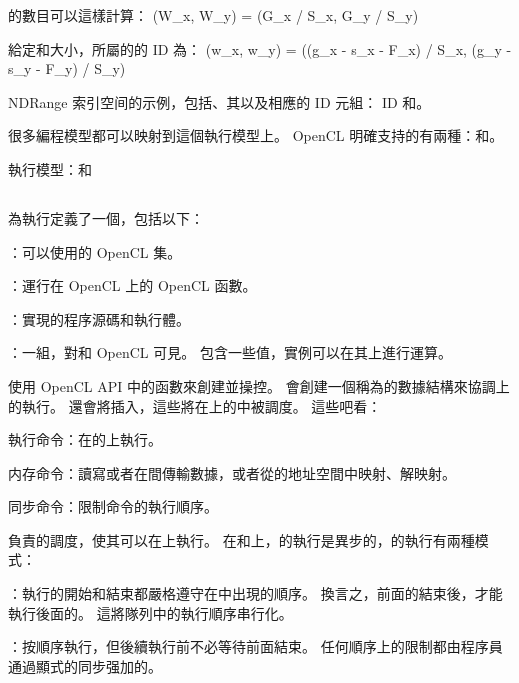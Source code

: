 的數目可以這樣計算：
\startformula
(W_x, W_y) = (G_x / S_x, G_y / S_y)
\stopformula

給定和大小，所屬的的 ID 為：
\startformula
(w_x, w_y) = ((g_x - s_x - F_x) / S_x, (g_y - s_y - F_y) / S_y)
\stopformula

\startbuffer[buffigindexspacecaption]
NDRange 索引空间的示例，包括、其以及相應的 ID 元組： ID 和。
\stopbuffer
{}
{}

很多編程模型都可以映射到這個執行模型上。
OpenCL 明確支持的有兩種：和。

\startbuffer[buftitleemccmdq]
執行模型：和
\stopbuffer
\subsection{\getbuffer[buftitleemccmdq]}

為執行定義了一個，包括以下：
\startigNum
\item {}：可以使用的 OpenCL 集。
\item {}：運行在 OpenCL 上的 OpenCL 函數。
\item {}：實現的程序源碼和執行體。
\item {}：一組，對和 OpenCL 可見。
包含一些值，實例可以在其上進行運算。
\stopigBase

使用 OpenCL API 中的函數來創建並操控。
會創建一個稱為的數據結構來協調上的執行。
還會將插入，這些將在上的中被調度。
這些吧看：
\startigBase
\item {\ftEmpha {}執行命令：}在的上執行。
\item {\ftEmpha 内存命令：}讀寫或者在間傳輸數據，或者從的地址空間中映射、解映射。
\item {\ftEmpha 同步命令：}限制命令的執行順序。
\stopigBase

負責的調度，使其可以在上執行。
在和上，的執行是異步的，的執行有兩種模式：
\startigBase
\item {\ftEmpha {}：}執行的開始和結束都嚴格遵守在中出現的順序。
換言之，前面的結束後，才能執行後面的。
這將隊列中的執行順序串行化。
\item {\ftEmpha {}：}按順序執行，但後續執行前不必等待前面結束。
任何順序上的限制都由程序員通過顯式的同步强加的。
\stopigBase

